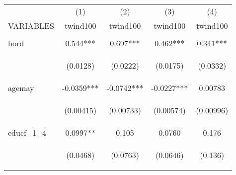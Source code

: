 \documentclass[]{article}
\begin{document}
\begin{center}
\begin{tabular}{lcccc} \hline
 & (1) & (2) & (3) & (4) \\
VARIABLES & twind100 & twind100 & twind100 & twind100 \\ \hline
\vspace{4pt} & \begin{footnotesize}\end{footnotesize} & \begin{footnotesize}\end{footnotesize} & \begin{footnotesize}\end{footnotesize} & \begin{footnotesize}\end{footnotesize} \\
bord & 0.544*** & 0.697*** & 0.462*** & 0.341*** \\
\vspace{4pt} & \begin{footnotesize}(0.0128)\end{footnotesize} & \begin{footnotesize}(0.0222)\end{footnotesize} & \begin{footnotesize}(0.0175)\end{footnotesize} & \begin{footnotesize}(0.0332)\end{footnotesize} \\
agemay & -0.0359*** & -0.0742*** & -0.0227*** & 0.00783 \\
\vspace{4pt} & \begin{footnotesize}(0.00415)\end{footnotesize} & \begin{footnotesize}(0.00733)\end{footnotesize} & \begin{footnotesize}(0.00574)\end{footnotesize} & \begin{footnotesize}(0.00996)\end{footnotesize} \\
educf\_1\_4 & 0.0997** & 0.105 & 0.0760 & 0.176 \\
\vspace{4pt} & \begin{footnotesize}(0.0468)\end{footnotesize} & \begin{footnotesize}(0.0763)\end{footnotesize} & \begin{footnotesize}(0.0646)\end{footnotesize} & \begin{footnotesize}(0.136)\end{footnotesize} \\

\end{tabular}
\end{center}
\end{document}
